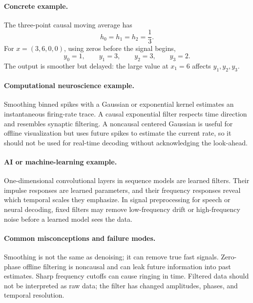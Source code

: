 \paragraph{Concrete example.}
The three-point causal moving average has
\[
h_0=h_1=h_2=\frac13.
\]
For \(x=(3,6,0,0)\), using zeros before the signal begins,
\[
y_0=1,\qquad y_1=3,\qquad y_2=3,\qquad y_3=2.
\]
The output is smoother but delayed: the large value at \(x_1=6\) affects \(y_1,y_2,y_3\).

\paragraph{Computational neuroscience example.}
Smoothing binned spikes with a Gaussian or exponential kernel estimates an instantaneous firing-rate trace. A causal exponential filter respects time direction and resembles synaptic filtering. A noncausal centered Gaussian is useful for offline visualization but uses future spikes to estimate the current rate, so it should not be used for real-time decoding without acknowledging the look-ahead.

\paragraph{AI or machine-learning example.}
One-dimensional convolutional layers in sequence models are learned filters. Their impulse responses are learned parameters, and their frequency responses reveal which temporal scales they emphasize. In signal preprocessing for speech or neural decoding, fixed filters may remove low-frequency drift or high-frequency noise before a learned model sees the data.

\paragraph{Common misconceptions and failure modes.}
Smoothing is not the same as denoising; it can remove true fast signals. Zero-phase offline filtering is noncausal and can leak future information into past estimates. Sharp frequency cutoffs can cause ringing in time. Filtered data should not be interpreted as raw data; the filter has changed amplitudes, phases, and temporal resolution.

